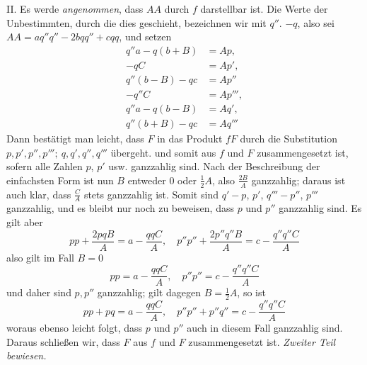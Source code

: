 II. Es werde \textit{angenommen}, dass \(AA\) durch \(f\) darstellbar ist. Die Werte der Unbestimmten, durch die dies geschieht, bezeichnen wir mit \(q''\). \(-q\), also sei \(AA=aq''q''-2bqq''+cqq\), und setzen
\[
\begin{aligned}
q''a-q(b+B)&=Ap,\\ -qC&=Ap',\\ q''(b-B)-qc&=Ap''\\ -q''C&=Ap''',\\ q''a-q(b-B)&=Aq',\\ q''(b+B)-qc&=Aq'''
\end{aligned}
\]
Dann bestätigt man leicht, dass \(F\) in das Produkt \(fF\) durch die Substitution \(p,\allowbreak p',\allowbreak p'',\allowbreak p''';\allowbreak \ q,\allowbreak q',\allowbreak q'',\allowbreak q'''\) übergeht. und somit aus \(f\) und \(F\) zusammengesetzt ist, sofern alle Zahlen \(p\), \(p'\) usw. ganzzahlig sind. Nach der Beschreibung der einfachsten Form ist nun \(B\) entweder \(0\) oder \(\frac12 A\), also \(\frac{2B}{A}\) ganzzahlig; daraus ist auch klar, dass \(\frac{C}{A}\) stets ganzzahlig ist. Somit sind \(q'-p\), \(p'\), \(q'''-p''\), \(p'''\) ganzzahlig, und es bleibt nur noch zu beweisen, dass \(p\) und \(p''\) ganzzahlig sind. Es gilt aber
\[
pp+\frac{2pqB}{A}=a-\frac{qqC}{A},\quad p''p''+\frac{2p''q''B}{A}=c-\frac{q''q''C}{A}
\]
also gilt im Fall \(B=0\)
\[
pp=a-\frac{qqC}{A},\quad p''p''=c-\frac{q''q''C}{A}
\]
und daher sind \(p,p''\) ganzzahlig; gilt dagegen \(B=\frac12 A\), so ist
\[
pp+pq=a-\frac{qqC}{A},\quad p''p''+p''q''=c-\frac{q''q''C}{A}
\]
woraus ebenso leicht folgt, dass \(p\) und \(p''\) auch in diesem Fall ganzzahlig sind. Daraus schließen wir, dass \(F\) aus \(f\) und \(F\) zusammengesetzt ist. \textit{Zweiter Teil bewiesen.}

